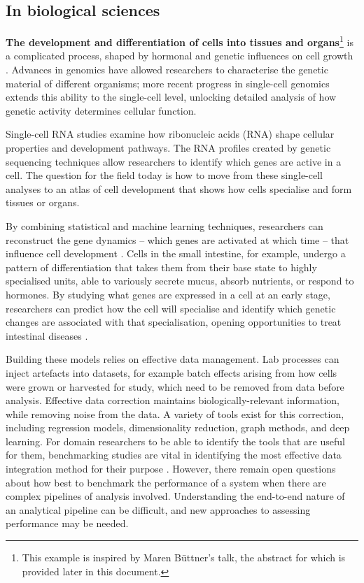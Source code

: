\subsection{In biological sciences}\label{in-biological-sciences}

\noindent\textbf{The development and differentiation of cells into tissues and
organs}\footnote{This example is inspired by Maren Büttner's talk, the
  abstract for which is provided later in this document.} is a
complicated process, shaped by hormonal and genetic influences on cell
growth \cite{Krishnamurthy-development15}.
Advances in genomics have allowed researchers to characterise the
genetic material of different organisms; more recent progress in
single-cell genomics extends this ability to the single-cell level,
unlocking detailed analysis of how genetic activity determines cellular
function.

Single-cell RNA studies examine how ribonucleic acids (RNA) shape
cellular properties and development pathways. The RNA profiles created
by genetic sequencing techniques allow researchers to identify which
genes are active in a cell. The question for the field today is how to
move from these single-cell analyses to an atlas of cell development
that shows how cells specialise and form tissues or organs.

By combining statistical and machine learning techniques, researchers
can reconstruct the gene dynamics -- which genes are activated at which
time -- that influence cell development \cite{Haghverdi-diffusion16}.
Cells in the small intestine, for example, undergo a pattern of
differentiation that takes them from their base state to highly
specialised units, able to variously secrete mucus, absorb nutrients,
or respond to hormones. By studying what genes are expressed in a cell
at an early stage, researchers can predict how the cell will specialise
and identify which genetic changes are associated with that
specialisation, opening opportunities to treat intestinal
diseases \cite{Bottcher-noncanonical21}.

Building these models relies on effective data management. Lab processes
can inject artefacts into datasets, for example batch effects arising
from how cells were grown or harvested for study, which need to be
removed from data before analysis. Effective data correction maintains
biologically-relevant information, while removing noise from the data. A
variety of tools exist for this correction, including regression models,
dimensionality reduction, graph methods, and deep learning. For domain
researchers to be able to identify the tools that are useful for them,
benchmarking studies are vital in identifying the most effective data
integration method for their purpose \cite{Luecken-benchmarking22}.
However, there remain open questions about how best to benchmark the
performance of a system when there are complex pipelines of analysis
involved. Understanding the end-to-end nature of an analytical pipeline
can be difficult, and new approaches to assessing performance may be
needed.

